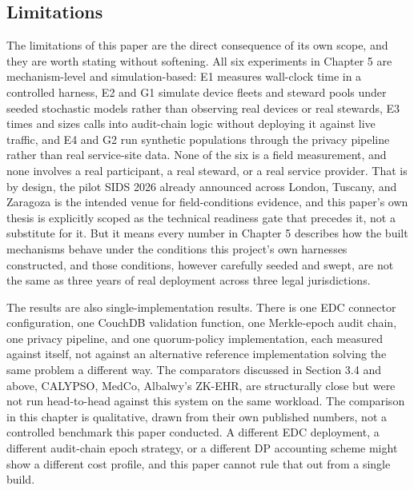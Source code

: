 \subsection{Limitations}

The limitations of this paper are the direct consequence of its own scope, and they are worth stating without softening. All six experiments in Chapter 5 are mechanism-level and simulation-based: E1 measures wall-clock time in a controlled harness, E2 and G1 simulate device fleets and steward pools under seeded stochastic models rather than observing real devices or real stewards, E3 times and sizes calls into audit-chain logic without deploying it against live traffic, and E4 and G2 run synthetic populations through the privacy pipeline rather than real service-site data. None of the six is a field measurement, and none involves a real participant, a real steward, or a real service provider. That is by design, the pilot SIDS 2026 already announced across London, Tuscany, and Zaragoza is the intended venue for field-conditions evidence, and this paper's own thesis is explicitly scoped as the technical readiness gate that precedes it, not a substitute for it. But it means every number in Chapter 5 describes how the built mechanisms behave under the conditions this project's own harnesses constructed, and those conditions, however carefully seeded and swept, are not the same as three years of real deployment across three legal jurisdictions.

The results are also single-implementation results. There is one EDC connector configuration, one CouchDB validation function, one Merkle-epoch audit chain, one privacy pipeline, and one quorum-policy implementation, each measured against itself, not against an alternative reference implementation solving the same problem a different way. The comparators discussed in Section 3.4 and above, CALYPSO, MedCo, Albalwy's ZK-EHR, are structurally close but were not run head-to-head against this system on the same workload. The comparison in this chapter is qualitative, drawn from their own published numbers, not a controlled benchmark this paper conducted. A different EDC deployment, a different audit-chain epoch strategy, or a different DP accounting scheme might show a different cost profile, and this paper cannot rule that out from a single build.

